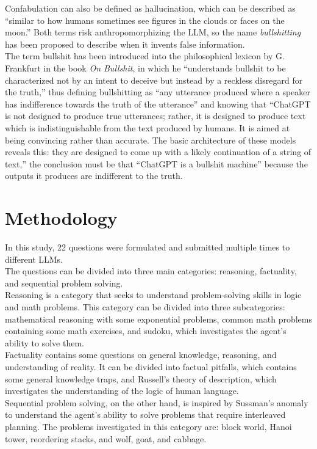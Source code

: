 \documentclass[12pt]{article}
\begin{document}
Confabulation can also be defined as hallucination, which can be described as “similar to how humans sometimes see figures in the clouds or faces on the moon.”\cite{IBMhallucinations} Both terms risk anthropomorphizing the LLM, so the name \textit{bullshitting} has been proposed to describe when it invents false information.\cite{bullshit}\\
The term bullshit has been introduced into the philosophical lexicon by G. Frankfurt in the book \textit{On Bullshit}, in which he “understands bullshit to be characterized not by an intent to deceive but instead by a reckless disregard for the truth,” thus defining bullshitting as “any utterance produced where a speaker has indifference towards the truth of the utterance” and knowing that “ChatGPT is not designed to produce true utterances; rather, it is designed to produce text which is indistinguishable from the text produced by humans. It is aimed at being convincing rather than accurate. The basic architecture of these models reveals this: they are designed to come up with a likely continuation of a string of text,” the conclusion must be that “ChatGPT is a bullshit machine” because the outputs it produces are indifferent to the truth.\cite{bullshit}
     
\clearpage
\section{Methodology}

    In this study, 22 questions were formulated and submitted multiple times to different LLMs.\\
The questions can be divided into three main categories: reasoning, factuality, and sequential problem solving.\\
Reasoning is a category that seeks to understand problem-solving skills in logic and math problems. This category can be divided into three subcategories: mathematical reasoning with some exponential problems, common math problems containing some math exercises, and sudoku, which investigates the agent's ability to solve them.\\
Factuality contains some questions on general knowledge, reasoning, and understanding of reality. It can be divided into factual pitfalls, which contains some general knowledge traps, and Russell's theory of description, which investigates the understanding of the logic of human language.\\
Sequential problem solving, on the other hand, is inspired by Sussman's anomaly to understand the agent's ability to solve problems that require interleaved planning. The problems investigated in this category are: block world, Hanoi tower, reordering stacks, and wolf, goat, and cabbage.\\
\end{document}
